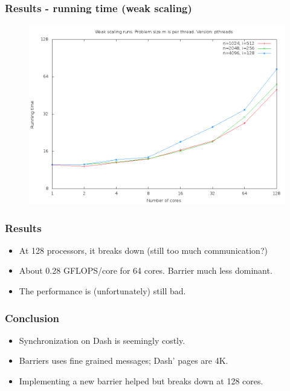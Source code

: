 \documentclass{beamer}
\begin{document}
\begin{frame}
\frametitle{Results - running time (weak scaling)}
\begin{figure}
\includegraphics[width=\textwidth]{gfx/partitions_constant_width_tournament_barrier_weak_scaling_pthreads_runningtime}
\end{figure}
\end{frame}

\begin{frame}
\frametitle{Results}
\begin{itemize}
\item At 128 processors, it breaks down (still too much communication?)
\pause
\item About 0.28 GFLOPS/core for 64 cores. Barrier much less dominant.
\pause
\item The performance is (unfortunately) still bad.
\end{itemize}
\end{frame}

\begin{frame}
\frametitle{Conclusion}
\begin{itemize}
\item Synchronization on Dash is seemingly costly.
\pause
\item Barriers uses fine grained messages; Dash' pages are 4K.
\pause
\item Implementing a new barrier helped but breaks down at 128 cores.
\end{itemize}
\end{frame}
\end{document}
